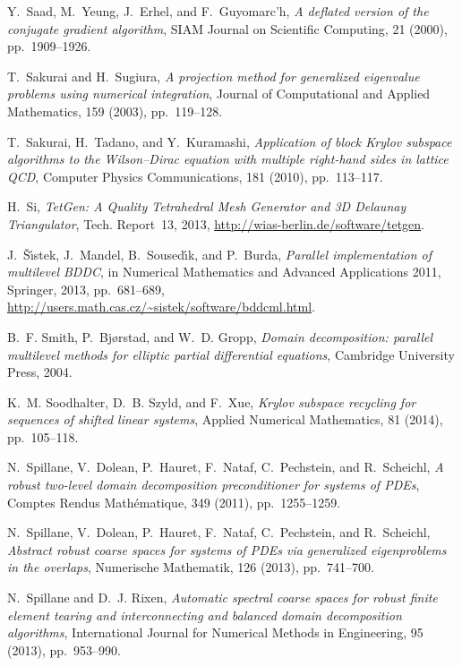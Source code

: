 \documentclass[3p,11pt]{elsarticle}
\begin{document}
\begin{thebibliography}{10}
{\sc Y.~Saad, M.~Yeung, J.~Erhel, and F.~Guyomarc'h}, {\em A deflated version
  of the conjugate gradient algorithm}, SIAM Journal on Scientific Computing,
  21 (2000), pp.~1909--1926.

{\sc T.~Sakurai and H.~Sugiura}, {\em A projection method for generalized
  eigenvalue problems using numerical integration}, Journal of Computational
  and Applied Mathematics, 159 (2003), pp.~119--128.

{\sc T.~Sakurai, H.~Tadano, and Y.~Kuramashi}, {\em {Application of block
  Krylov subspace algorithms to the Wilson--Dirac equation with multiple
  right-hand sides in lattice QCD}}, Computer Physics Communications, 181
  (2010), pp.~113--117.

{\sc H.~Si}, {\em {TetGen: A Quality Tetrahedral Mesh Generator and 3D Delaunay
  Triangulator}}, Tech. Report~13, 2013,
  \url{http://wias-berlin.de/software/tetgen}.

{\sc J.~{\v{S}}{\'\i}stek, J.~Mandel, B.~Soused{\'\i}k, and P.~Burda}, {\em
  Parallel implementation of multilevel {BDDC}}, in Numerical Mathematics and
  Advanced Applications 2011, Springer, 2013, pp.~681--689,
  \url{http://users.math.cas.cz/~sistek/software/bddcml.html}.

{\sc B.~F. Smith, P.~Bj{\o}rstad, and W.~D. Gropp}, {\em Domain decomposition:
  parallel multilevel methods for elliptic partial differential equations},
  Cambridge University Press, 2004.

{\sc K.~M. Soodhalter, D.~B. Szyld, and F.~Xue}, {\em Krylov subspace recycling
  for sequences of shifted linear systems}, Applied Numerical Mathematics, 81
  (2014), pp.~105--118.

{\sc N.~Spillane, V.~Dolean, P.~Hauret, F.~Nataf, C.~Pechstein, and
  R.~Scheichl}, {\em A robust two-level domain decomposition preconditioner for
  systems of {PDE}s}, Comptes Rendus Mathématique, 349 (2011), pp.~1255--1259.

{\sc N.~Spillane, V.~Dolean, P.~Hauret, F.~Nataf, C.~Pechstein, and
  R.~Scheichl}, {\em Abstract robust coarse spaces for systems of {PDEs} via
  generalized eigenproblems in the overlaps}, Numerische Mathematik, 126
  (2013), pp.~741--700.

{\sc N.~Spillane and D.~J. Rixen}, {\em Automatic spectral coarse spaces for
  robust finite element tearing and interconnecting and balanced domain
  decomposition algorithms}, International Journal for Numerical Methods in
  Engineering, 95 (2013), pp.~953--990.


\end{thebibliography}
\end{document}
